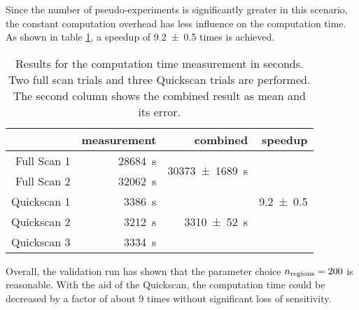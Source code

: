 Since the number of pseudo-experiments is significantly greater in this scenario, the constant computation overhead has less influence on the computation time. As shown in table \ref{tbl:validation_speedup}, a speedup of \num{9.2 +- 0.5} times is achieved.

\begin{table}[htbp]
	\centering
	\begin{tabular}{| r | r | r | r | }
		\cline{2-4}
		\multicolumn{1}{c|}{} & measurement & combined & speedup \\ \hline
		Full Scan 1 & \SI{28684}{\second} & \multirow{2}{*}{\SI{30373 +- 1689}{\second}} & \multirow{5}{*}{\num{9.2 +- 0.5}} \\
		Full Scan 2 & \SI{32062}{\second} & & \\
		\cline{1-3}
		Quickscan 1 & \SI{3386}{\second} & \multirow{3}{*}{\SI{3310 +- 52}{\second}} & \\
		Quickscan 2 & \SI{3212}{\second} & & \\
		Quickscan 3 & \SI{3334}{\second} & & \\
		\hline
	\end{tabular}
	\caption{Results for the computation time measurement in seconds. Two full scan trials and three Quickscan trials are performed. The second column shows the combined result as mean and its error.}
	\label{tbl:validation_speedup}
\end{table}

Overall, the validation run has shown that the parameter choice $ {n_\mathrm{regions}} = \num{200} $ is reasonable. With the aid of the Quickscan, the computation time could be decreased by a factor of about \num{9} times without significant loss of sensitivity.